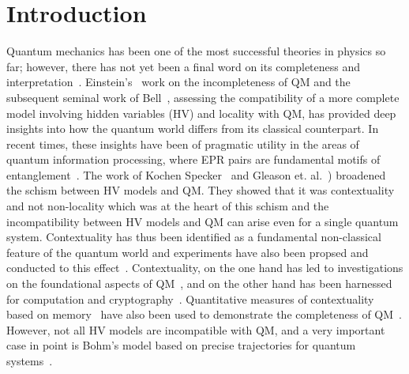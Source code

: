 \documentclass[british,aps,prl,superscriptaddress,nofootinbib,times,reprint]{revtex4-1}
\theoremstyle{plain}
\theoremstyle{definition}
\theoremstyle{remark}
\theoremstyle{plain}
\theoremstyle{plain}
\theoremstyle{plain}
\theoremstyle{definition}
\theoremstyle{definition}
\begin{document}
\section{Introduction}
\label{introduction}
Quantum mechanics has been one of the most
successful theories in physics so far; however,
there has not yet been a final word on its
completeness and interpretation~\cite{??}.
Einstein's~\cite{EinsteinEPR} work on the
incompleteness of QM and the subsequent seminal
work of Bell~\cite{Bell1964}, assessing the
compatibility of a more complete model involving
hidden variables (HV) and locality with QM, has
provided deep insights into  how the quantum world
differs from its classical counterpart.  In recent
times, these insights have been of pragmatic
utility in the areas of quantum information
processing, where EPR pairs are fundamental motifs
of entanglement~\cite{Ekert,PironioRndmnssCrtfcn}.
The work of  Kochen Specker~\cite{KochenSpecker}
and Gleason et.
al.~\cite{Gleason,BellOnHiddenVariables,Peres,Mermin})
broadened the schism between  HV models and QM.
They showed that it was contextuality and not
non-locality which was at the heart of this schism
and the incompatibility between HV models and QM
can arise even for a single quantum system.
Contextuality has thus been identified as a
fundamental non-classical feature of the quantum
world and experiments have also been propsed and
conducted to this effect~\cite{SimonContExpProp,
HuangContExp,YangContExp,HasegawaContExp}.
Contextuality, on the one hand has led to
investigations on the foundational aspects of
QM~\cite{PawelCntxClsscl,?????}, and on the other
hand has been harnessed for computation and
cryptography~\cite{HowardCntxCmptn,CabelloCntxScrt,??}.
Quantitative measures of contextuality based on
memory~\cite{MatthiasCntxMmry} have also been used
to demonstrate the completeness of
QM~\cite{CabelloMmryQM}.  However, not all HV
models are incompatible with QM, and a very
important case in point is  Bohm's model based on
precise trajectories for quantum
systems~\cite{Bohm1,Bohm2}. 
\end{document}

